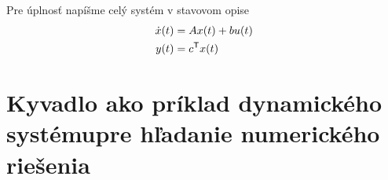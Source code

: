 \documentclass[a4paper, 10pt, ]{article}
\begin{document}
Pre úplnosť napíšme celý systém v stavovom opise
\begin{subequations} \label{stavovyPriestorPrikladCely}
\begin{align}
    \dot x(t) &= Ax(t) + bu(t)   \\
    y(t) &= c^{\mathsf{T}}  x(t)
\end{align}
\end{subequations}









\section{Kyvadlo ako príklad dynamického systému\newline pre hľadanie numerického riešenia}
\end{document}
